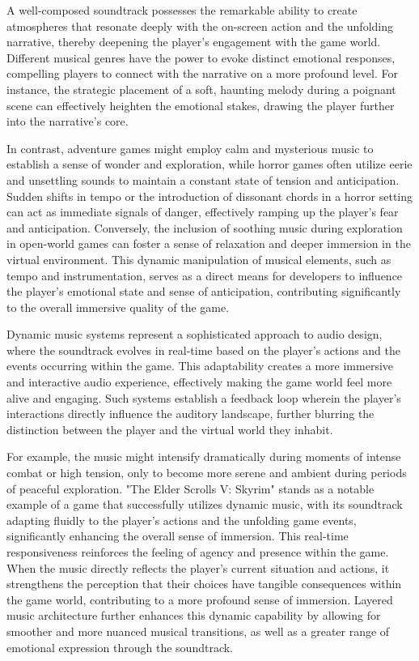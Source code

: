 \documentclass{article}
\begin{document}
    A well-composed soundtrack possesses the remarkable ability to create atmospheres that resonate deeply with the on-screen action and the unfolding narrative, thereby deepening the player's engagement with the game world. Different musical genres have the power to evoke distinct emotional responses, compelling players to connect with the narrative on a more profound level. For instance, the strategic placement of a soft, haunting melody during a poignant scene can effectively heighten the emotional stakes, drawing the player further into the narrative's core.

    In contrast, adventure games might employ calm and mysterious music to establish a sense of wonder and exploration, while horror games often utilize eerie and unsettling sounds to maintain a constant state of tension and anticipation. Sudden shifts in tempo or the introduction of dissonant chords in a horror setting can act as immediate signals of danger, effectively ramping up the player's fear and anticipation. Conversely, the inclusion of soothing music during exploration in open-world games can foster a sense of relaxation and deeper immersion in the virtual environment. This dynamic manipulation of musical elements, such as tempo and instrumentation, serves as a direct means for developers to influence the player's emotional state and sense of anticipation, contributing significantly to the overall immersive quality of the game.

    Dynamic music systems represent a sophisticated approach to audio design, where the soundtrack evolves in real-time based on the player's actions and the events occurring within the game. This adaptability creates a more immersive and interactive audio experience, effectively making the game world feel more alive and engaging. Such systems establish a feedback loop wherein the player's interactions directly influence the auditory landscape, further blurring the distinction between the player and the virtual world they inhabit.

    For example, the music might intensify dramatically during moments of intense combat or high tension, only to become more serene and ambient during periods of peaceful exploration. "The Elder Scrolls V: Skyrim" stands as a notable example of a game that successfully utilizes dynamic music, with its soundtrack adapting fluidly to the player's actions and the unfolding game events, significantly enhancing the overall sense of immersion. This real-time responsiveness reinforces the feeling of agency and presence within the game. When the music directly reflects the player's current situation and actions, it strengthens the perception that their choices have tangible consequences within the game world, contributing to a more profound sense of immersion. Layered music architecture further enhances this dynamic capability by allowing for smoother and more nuanced musical transitions, as well as a greater range of emotional expression through the soundtrack.
\end{document}
